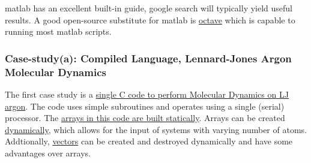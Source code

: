 matlab has an excellent built-in guide, google search will typically 
yield useful results. A good open-source substitute for matlab is 
\href{http://www.gnu.org/software/octave/}
{octave} which is capable to running most matlab scripts.

\subsubsection{\label{A:coding_lang:case1}Case-study(a): Compiled 
Language, Lennard-Jones Argon Molecular Dynamics}

The first case study is a 
\href{https://github.com/jasonlarkin/classes/tree/master/cmu/molecular_simulation/HW5}
{single C code to perform Molecular Dynamics 
on LJ argon}. The code uses simple subroutines and operates using 
a single (serial) processor. The 
\href{http://www.cplusplus.com/doc/tutorial/arrays/}
{arrays in this code are built statically}. 
Arrays can be created 
\href{http://www.cplusplus.com/doc/tutorial/dynamic/}{dynamically}, 
which allows for the input of systems with varying number of 
atoms. Addtionally, 
\href{http://www.cplusplus.com/reference/vector/vector/}{vectors} 
can be created and destroyed dynamically and have some advantages 
over arrays.  

